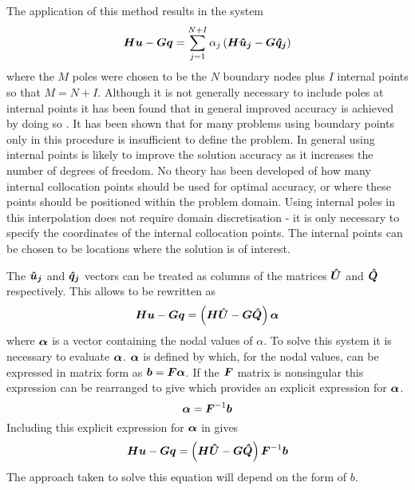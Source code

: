 The application of this method results in the system
\begin{equation}
  \matr{H} \vect{u} - \matr{G} \vect{q} = \dsuml{j=1}{N+I} \alpha_{j}
  \pbrac{\matr{H} \vect{\hat{u}_{j}} - \matr{G} \vect{\hat{q}_{j}}}
\label{eq:sumin}
\end{equation}
where the $M$ poles were chosen to be the $N$ boundary nodes plus $I$ internal
points so that $M = N+I$. Although it is not generally necessary to include
poles at internal points it has been found that in general improved accuracy
is achieved by doing so \cite{nowak:1992}.  It has been shown that for many
problems \cite{partridge:1992} \cite{cruse:1993} using boundary points only in
this procedure is insufficient to define the problem.  In general using
internal points is likely to improve the solution accuracy as it increases the
number of degrees of freedom.  No theory has been developed of how many
internal collocation points should be used for optimal accuracy, or where
these points should be positioned within the problem domain. Using internal
poles in this interpolation does not require domain discretisation - it is
only necessary to specify the coordinates of the internal collocation points.
The internal points can be chosen to be locations where the solution is of
interest.

The $\vect{\hat{u}_{j}}$ and $\vect{\hat{q}_{j}}$ vectors can be treated as
columns of the matrices $\matr{\hat{U}}$ and $\matr{\hat{Q}}$ respectively.
This allows  to be rewritten as
\begin{equation}
  \matr{H} \vect{u} - \matr{G} \vect{q} = \pbrac{\matr{H} \matr{\hat{U}} -
    \matr{G} \matr{\hat{Q}}} \vect{\alpha}
\label{eq:drmalpha}
\end{equation}
where $\vect{\alpha}$ is a vector containing the nodal values of $\alpha$.
To solve this system it is necessary to evaluate $\vect{\alpha}$.
$\vect{\alpha}$ is defined by  which, for the nodal
values, can be expressed in matrix form as $\vect{b} = \matr{F}
\matr{\alpha}$. If the $\matr{F}$ matrix is nonsingular this expression can
be rearranged to give  which provides an explicit
expression for $\matr{\alpha}$.
\begin{equation}
  \vect{\alpha} = \matr{F}^{-1} \vect{b}
\label{eq:expalpha}
\end{equation}
Including this explicit expression for $\vect{\alpha}$ in 
 gives
\begin{equation}
  \matr{H} \vect{u} - \matr{G} \vect{q} = \pbrac{\matr{H} \matr{\hat{U}} -
    \matr{G} \matr{\hat{Q}}} \matr{F}^{-1} \vect{b}
\label{eq:drmsystem}
\end{equation}
The approach taken to solve this equation will depend on the form of $b$.

